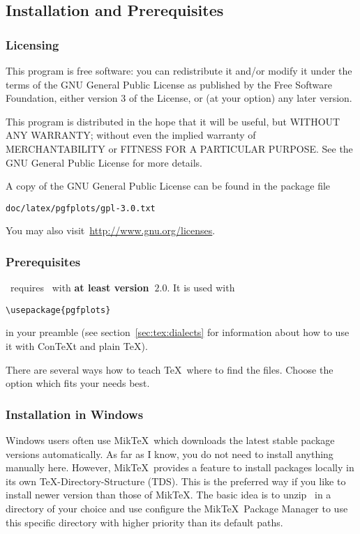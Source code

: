 
\subsection{Installation and Prerequisites}
\subsubsection{Licensing}
This program is free software: you can redistribute it and/or modify
it under the terms of the GNU General Public License as published by
the Free Software Foundation, either version 3 of the License, or
(at your option) any later version.

This program is distributed in the hope that it will be useful,
but WITHOUT ANY WARRANTY; without even the implied warranty of
MERCHANTABILITY or FITNESS FOR A PARTICULAR PURPOSE.  See the
GNU General Public License for more details.

A copy of the GNU General Public License can be found in the package file
\begin{verbatim}
doc/latex/pgfplots/gpl-3.0.txt
\end{verbatim}
You may also visit~\url{http://www.gnu.org/licenses}.

\subsubsection{Prerequisites}
\PGFPlots\ requires \PGF\ with \textbf{at least version~$2.0$}. It is used with
\begin{verbatim}
\usepackage{pgfplots}
\end{verbatim}
in your preamble (see section~\ref{sec:tex:dialects} for information about how to use it with Con{\TeX}t and plain \TeX).


There are several ways how to teach \TeX\ where to find the files. Choose the option which fits your needs best.

\subsubsection{Installation in Windows}
Windows users often use Mik\TeX\ which downloads the latest stable package versions automatically. As far as I know, you do not need to install anything manually here. However, Mik\TeX\ provides a feature to install packages locally in its own \TeX-Directory-Structure (TDS). This is the preferred way if you like to install newer version than those of Mik\TeX. The basic idea is to unzip \PGFPlots\ in a directory of your choice and use configure the Mik\TeX\ Package Manager to use this specific directory with higher priority than its default paths.

